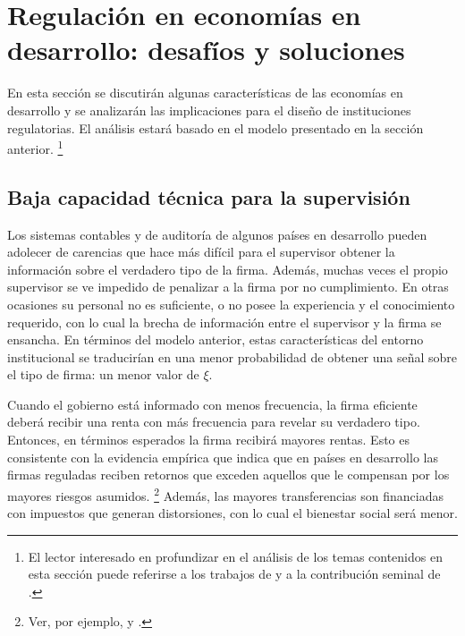 \documentclass[
  12pt,
  spanish,
]{book}
\begin{document}
\hypertarget{desafios}{%
\section{Regulación en economías en desarrollo: desafíos y
soluciones}\label{desafios}}

En esta sección se discutirán algunas características de las economías
en desarrollo y se analizarán las implicaciones para el diseño de
instituciones regulatorias. El análisis estará basado en el modelo
presentado en la sección anterior. \footnote{El lector interesado en
  profundizar en el análisis de los temas contenidos en esta sección
  puede referirse a los trabajos de \citet{Estache2009} y a la
  contribución seminal de \citet{Laffont2005}.}

\hypertarget{baja-capacidad-tuxe9cnica-para-la-supervisiuxf3n}{%
\subsection{Baja capacidad técnica para la
supervisión}\label{baja-capacidad-tuxe9cnica-para-la-supervisiuxf3n}}

Los sistemas contables y de auditoría de algunos países en desarrollo
pueden adolecer de carencias que hace más difícil para el supervisor
obtener la información sobre el verdadero tipo de la firma. Además,
muchas veces el propio supervisor se ve impedido de penalizar a la firma
por no cumplimiento. En otras ocasiones su personal no es suficiente, o
no posee la experiencia y el conocimiento requerido, con lo cual la
brecha de información entre el supervisor y la firma se ensancha. En
términos del modelo anterior, estas características del entorno
institucional se traducirían en una menor probabilidad de obtener una
señal sobre el tipo de firma: un menor valor de \(ξ\).

Cuando el gobierno está informado con menos frecuencia, la firma
eficiente deberá recibir una renta con más frecuencia para revelar su
verdadero tipo. Entonces, en términos esperados la firma recibirá
mayores rentas. Esto es consistente con la evidencia empírica que indica
que en países en desarrollo las firmas reguladas reciben retornos que
exceden aquellos que le compensan por los mayores riesgos asumidos.
\footnote{Ver, por ejemplo, \citet{Sirtaine2005} y \citet{Guasch2007}.}
Además, las mayores transferencias son financiadas con impuestos que
generan distorsiones, con lo cual el bienestar social será menor.
\end{document}
